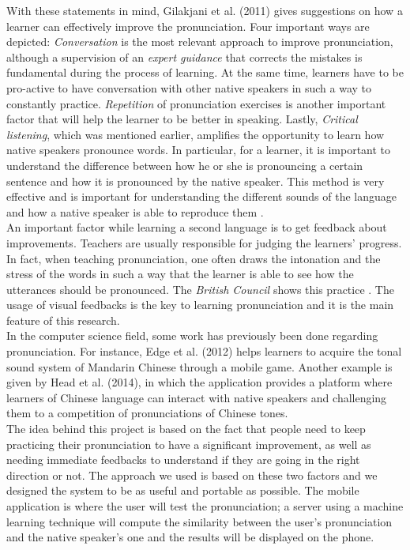 \noindent With these statements in mind, Gilakjani et al. (2011) gives suggestions on how a learner can effectively improve the pronunciation. Four important ways are depicted: \textit{Conversation} is the most relevant approach to improve pronunciation, although a supervision of an \textit{expert guidance} that corrects the mistakes is fundamental during the process of learning. At the same time, learners have to be pro-active to have conversation with other native speakers in such a way to constantly practice. \textit{Repetition} of pronunciation exercises is another important factor that will help the learner to be better in speaking. Lastly, \textit{Critical listening}, which was mentioned earlier, amplifies the opportunity to learn how native speakers pronounce words. In particular, for a learner, it is important to understand the difference between how he or she is pronouncing a certain sentence and how it is pronounced by the native speaker. This method is very effective and is important for understanding the different sounds of the language and how a native speaker is able to reproduce them \cite{rost2014listening}.\\

\noindent An important factor while learning a second language is to get feedback about improvements. Teachers are usually responsible for judging the learners' progress. In fact, when teaching pronunciation, one often draws the intonation and the stress of the words in such a way that the learner is able to see how the utterances should be pronounced. The \textit{British Council} shows this practice \cite{bbc_stress}. The usage of visual feedbacks is the key to learning pronunciation and it is the main feature of this research. \\

\noindent In the computer science field, some work has previously been done regarding pronunciation. For instance, Edge et al. (2012) helps learners to acquire the tonal sound system of Mandarin Chinese through a mobile game. Another example is given by Head et al. (2014), in which the application provides a platform where learners of Chinese language can interact with native speakers and challenging them to a competition of pronunciations of Chinese tones. \\

\noindent The idea behind this project is based on the fact that people need to keep practicing their pronunciation to have a significant improvement, as well as needing immediate feedbacks to understand if they are going in the right direction or not. The approach we used is based on these two factors and we designed the system to be as useful and portable as possible. The mobile application is where the user will test the pronunciation; a server using a machine learning technique will compute the similarity between the user's pronunciation and the native speaker's one and the results will be displayed on the phone. \\

